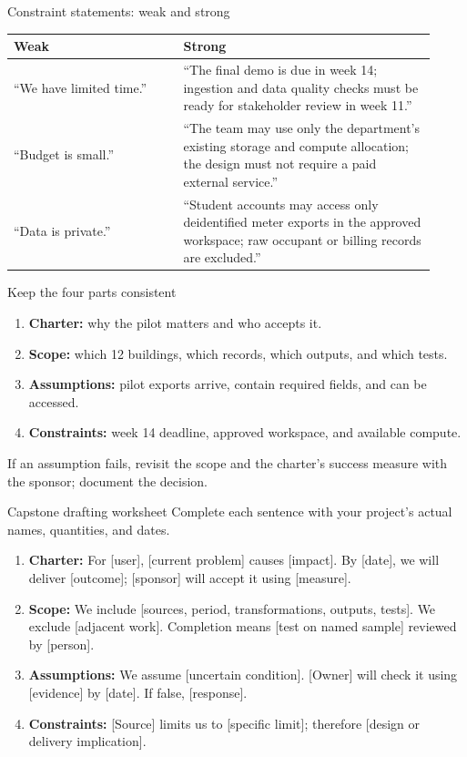 \documentclass[aspectratio=43,12pt]{beamer}
\begin{document}
\begin{frame}{Constraint statements: weak and strong}
\small
\begin{tabular}{p{0.375\linewidth}p{0.55\linewidth}}
\textbf{Weak} & \textbf{Strong}\\\hline
``We have limited time.'' & ``The final demo is due in week 14; ingestion and data quality checks must be ready for stakeholder review in week 11.''\\[0.7em]
``Budget is small.'' & ``The team may use only the department's existing storage and compute allocation; the design must not require a paid external service.''\\[0.7em]
``Data is private.'' & ``Student accounts may access only deidentified meter exports in the approved workspace; raw occupant or billing records are excluded.''
\end{tabular}
\end{frame}

\begin{frame}{Keep the four parts consistent}
\begin{enumerate}
\item \textbf{Charter:} why the pilot matters and who accepts it.
\item \textbf{Scope:} which 12 buildings, which records, which outputs, and which tests.
\item \textbf{Assumptions:} pilot exports arrive, contain required fields, and can be accessed.
\item \textbf{Constraints:} week 14 deadline, approved workspace, and available compute.
\end{enumerate}
\vspace{0.7em}
If an assumption fails, revisit the scope and the charter's success measure with the sponsor; document the decision.
\end{frame}

\begin{frame}{Capstone drafting worksheet}
\small
Complete each sentence with your project's actual names, quantities, and dates.
\begin{enumerate}
\item \textbf{Charter:} For [user], [current problem] causes [impact]. By [date], we will deliver [outcome]; [sponsor] will accept it using [measure].
\item \textbf{Scope:} We include [sources, period, transformations, outputs, tests]. We exclude [adjacent work]. Completion means [test on named sample] reviewed by [person].
\item \textbf{Assumptions:} We assume [uncertain condition]. [Owner] will check it using [evidence] by [date]. If false, [response].
\item \textbf{Constraints:} [Source] limits us to [specific limit]; therefore [design or delivery implication].
\end{enumerate}
\end{frame}
\end{document}
